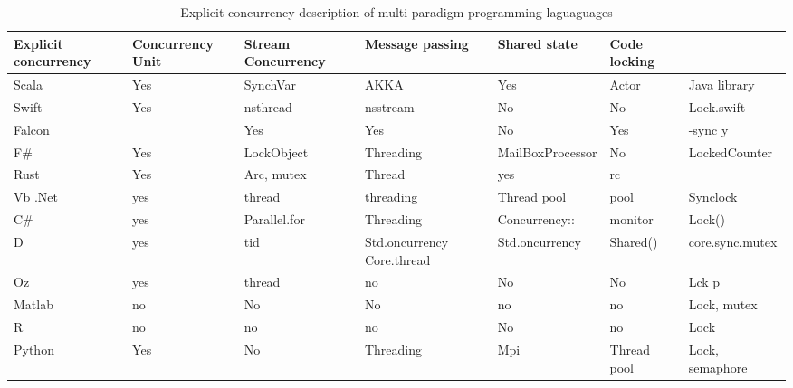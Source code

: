 \documentclass{sig-alternate}
\begin{document}
\begin{table*}[H]
\centering
\caption{Explicit concurrency description of multi-paradigm programming laguaguages}
\hline
\label{my-label}
\begin{tabular}{|l|l|l|l|l|l|l|}       \\ \hline
Explicit concurrency & Concurrency Unit & Stream Concurrency & Message passing            & Shared state     & Code locking &                 \\ \hline
Scala                & Yes              & SynchVar           & AKKA                       & Yes              & Actor        & Java library    \\ \hline
Swift                & Yes              & nsthread           & nsstream                   & No               & No           & Lock.swift      \\ \hline
Falcon               &                  & Yes                & Yes                        & No               & Yes          & -sync y         \\ \hline
F\#                  & Yes              & LockObject         & Threading                  & MailBoxProcessor & No           & LockedCounter   \\ \hline
Rust                 & Yes              & Arc, mutex         & Thread                     & yes              & rc           &                 \\ \hline
Vb .Net              & yes              & thread             & threading                  & Thread pool      & pool         & Synclock        \\ \hline
C\#                  & yes              & Parallel.for       & Threading                  & Concurrency::    & monitor      & Lock()          \\ \hline
D                    & yes              & tid                & Std.oncurrency Core.thread & Std.oncurrency   & Shared()     & core.sync.mutex \\ \hline
Oz                   & yes              & thread             & no                         & No               & No           & Lck p           \\ \hline
Matlab               & no               & No                 & No                         & no               & no           & Lock, mutex     \\ \hline
R                    & no               & no                 & no                         & No               & no           & Lock            \\ \hline
Python               & Yes              & No                 & Threading                  & Mpi              & Thread pool  & Lock, semaphore \\ \hline
\end{tabular}
\end{table*}
\end{document}
